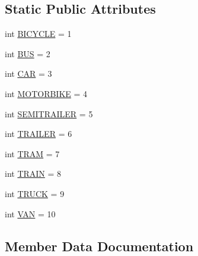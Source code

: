 \subsection*{Static Public Attributes}
\begin{DoxyCompactItemize}
\item 
int \hyperlink{classimplementation_1_1data__model_1_1vehicle_1_1_vehicle_category_a93a82dc40b630634b741128ccbffb564}{B\+I\+C\+Y\+C\+LE} = 1
\item 
int \hyperlink{classimplementation_1_1data__model_1_1vehicle_1_1_vehicle_category_a698df303bf9a91c2e290979f9cfea7d4}{B\+US} = 2
\item 
int \hyperlink{classimplementation_1_1data__model_1_1vehicle_1_1_vehicle_category_ab24325ffbf040ec83f99d32e1e2e551d}{C\+AR} = 3
\item 
int \hyperlink{classimplementation_1_1data__model_1_1vehicle_1_1_vehicle_category_a3771a262a7993a4f15a74253da2ffef3}{M\+O\+T\+O\+R\+B\+I\+KE} = 4
\item 
int \hyperlink{classimplementation_1_1data__model_1_1vehicle_1_1_vehicle_category_ac84377edf021aba2bf9dce1e90ea3eed}{S\+E\+M\+I\+T\+R\+A\+I\+L\+ER} = 5
\item 
int \hyperlink{classimplementation_1_1data__model_1_1vehicle_1_1_vehicle_category_a1b4fa8d641ab0fbe15fa1228281bd470}{T\+R\+A\+I\+L\+ER} = 6
\item 
int \hyperlink{classimplementation_1_1data__model_1_1vehicle_1_1_vehicle_category_a4632f141f690e4351b139adc2c65f74a}{T\+R\+AM} = 7
\item 
int \hyperlink{classimplementation_1_1data__model_1_1vehicle_1_1_vehicle_category_ad21006a376dc349b36c1e7c006b3188e}{T\+R\+A\+IN} = 8
\item 
int \hyperlink{classimplementation_1_1data__model_1_1vehicle_1_1_vehicle_category_a97f5d6e862e46e86dac86469c3a81489}{T\+R\+U\+CK} = 9
\item 
int \hyperlink{classimplementation_1_1data__model_1_1vehicle_1_1_vehicle_category_a9e037eb3c75a2f338edc00fed5641ecb}{V\+AN} = 10
\end{DoxyCompactItemize}


\subsection{Member Data Documentation}
\mbox{\label{classimplementation_1_1data__model_1_1vehicle_1_1_vehicle_category_a93a82dc40b630634b741128ccbffb564}} 
